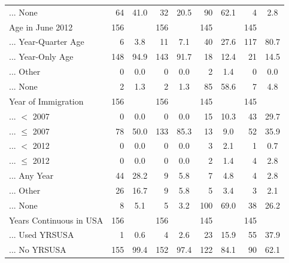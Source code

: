 \begin{tabular}{lrcrcrcrc}
... None & 64 & 41.0 & 32 & 20.5 & 90 & 62.1 & 4 & 2.8 \\
Age in June 2012 & 156 & & 156 & & 145 & & 145 & \\
... Year-Quarter Age & 6 & 3.8 & 11 & 7.1 & 40 & 27.6 & 117 & 80.7 \\
... Year-Only Age & 148 & 94.9 & 143 & 91.7 & 18 & 12.4 & 21 & 14.5 \\
... Other & 0 & 0.0 & 0 & 0.0 & 2 & 1.4 & 0 & 0.0 \\
... None & 2 & 1.3 & 2 & 1.3 & 85 & 58.6 & 7 & 4.8 \\
Year of Immigration & 156 & & 156 & & 145 & & 145 & \\
... $<$ 2007 & 0 & 0.0 & 0 & 0.0 & 15 & 10.3 & 43 & 29.7 \\
... $\leq$ 2007 & 78 & 50.0 & 133 & 85.3 & 13 & 9.0 & 52 & 35.9 \\
... $<$ 2012 & 0 & 0.0 & 0 & 0.0 & 3 & 2.1 & 1 & 0.7 \\
... $\leq$ 2012 & 0 & 0.0 & 0 & 0.0 & 2 & 1.4 & 4 & 2.8 \\
... Any Year & 44 & 28.2 & 9 & 5.8 & 7 & 4.8 & 4 & 2.8 \\
... Other & 26 & 16.7 & 9 & 5.8 & 5 & 3.4 & 3 & 2.1 \\
... None & 8 & 5.1 & 5 & 3.2 & 100 & 69.0 & 38 & 26.2 \\
Years Continuous in USA & 156 & & 156 & & 145 & & 145 & \\
... Used YRSUSA & 1 & 0.6 & 4 & 2.6 & 23 & 15.9 & 55 & 37.9 \\
... No YRSUSA & 155 & 99.4 & 152 & 97.4 & 122 & 84.1 & 90 & 62.1 \\
\bottomrule
\end{tabular}
